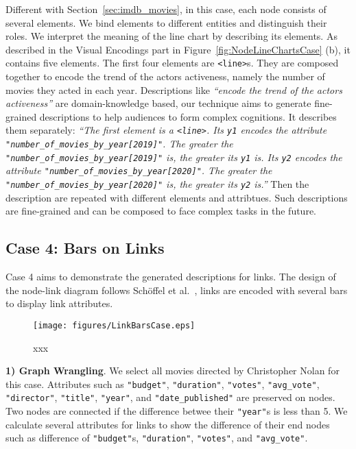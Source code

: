 Different with Section~\ref{sec:imdb_movies}, in this case, each node consists of several elements.
We bind elements to different entities and distinguish their roles.
We interpret the meaning of the line chart by describing its elements.
As described in the Visual Encodings part in Figure~\ref{fig:NodeLineChartsCase} (b), it contains five elements.
The first four elements are \texttt{<line>}s.
They are composed together to encode the trend of the actors activeness, namely the number of movies they acted in each year.
Descriptions like \textit{``encode the trend of the actors activeness''} are domain-knowledge based,
our technique aims to generate fine-grained descriptions to help audiences to form complex cognitions.
It describes them separately: 
\textit{``The first element is a \texttt{<line>}. 
Its \texttt{y1} encodes the attribute \texttt{"number\_of\_movies\_by\_year[2019]"}. 
The greater the \texttt{"number\_of\_movies\_by\_year[2019]"} is, the greater its \texttt{y1} is. 
Its \texttt{y2} encodes the attribute \texttt{"number\_of\_movies\_by\_year[2020]"}.
The greater the \texttt{"number\_of\_movies\_by\_year[2020]"} is, the greater its \texttt{y2} is.''}
Then the description are repeated with different elements and attribtues.
Such descriptions are fine-grained and can be composed to face complex tasks in the future.


\subsection{Case 4: Bars on Links}
Case 4 aims to demonstrate the generated descriptions for links.
The design of the node-link diagram follows Sch{\"{o}}ffel et al.~\cite{DBLP:conf/iv/SchoffelSE16}, links are encoded with several bars to display link attributes.

\begin{figure*}[ht]
    \centering
    \texttt{[image: figures/LinkBarsCase.eps]}
    \caption{xxx}
    \label{fig:LinkBarsCase}
\end{figure*}

\textbf{1) Graph Wrangling}.
We select all movies directed by Christopher Nolan for this case.
Attributes such as \texttt{"budget"}, \texttt{"duration"}, \texttt{"votes"}, \texttt{"avg\_vote"}, \texttt{"director"}, \texttt{"title"}, \texttt{"year"}, and \texttt{"date\_published"} are preserved on nodes.
Two nodes are connected if the difference betwee their \texttt{"year"}s is less than 5.
We calculate several attributes for links to show the difference of their end nodes such as difference of \texttt{"budget"}s, \texttt{"duration"}, \texttt{"votes"}, and \texttt{"avg\_vote"}.

